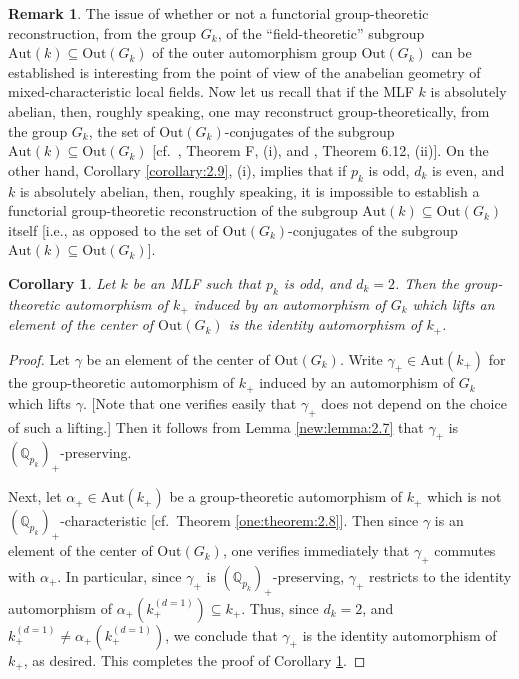 \documentclass[12pt,showkeys]{amsart}
\theoremstyle{theorem}
\newtheorem{corollary}[theorem]{Corollary}
\theoremstyle{definition}
\newtheorem{remark}[theorem]{Remark}
\begin{document}
\begin{remark}\label{remark:2.11}
The issue of whether or not a functorial group-theoretic 
reconstruction, from the group $G_k$, of the 
``field-theoretic'' subgroup $\mathrm{Aut}(k) \subseteq 
\mathrm{Out}(G_k)$ of the outer automorphism group 
$\mathrm{Out}(G_k)$ can be established is interesting 
from the point of view of the anabelian geometry of 
mixed-characteristic local fields.  Now let us recall 
that if the MLF $k$ is absolutely abelian, then, roughly 
speaking, one may reconstruct group-theoretically, from 
the group $G_k$, the set of $\mathrm{Out}(G_k)$-conjugates 
of the subgroup $\mathrm{Aut}(k) \subseteq 
\mathrm{Out}(G_k)$ [cf.\ \cite{Hoshi2}, Theorem F, (i), and 
\cite{Hoshi2}, Theorem 6.12, (ii)].  
On the other hand, Corollary \ref{corollary:2.9}, (i), implies that if 
$p_k$ is odd, $d_k$ is even, and $k$ is absolutely abelian, 
then, roughly speaking, it is impossible to establish a functorial group-theoretic reconstruction of the subgroup 
$\mathrm{Aut}(k) \subseteq \mathrm{Out}(G_k)$ itself [i.e., 
as opposed to the set of $\mathrm{Out}(G_k)$-conjugates of the 
subgroup $\mathrm{Aut}(k) \subseteq \mathrm{Out}(G_k)$]. 
\end{remark}

\begin{corollary}\label{Corollary 3.8} 
Let $k$ be an MLF such that $p_k$ is odd, and $d_k = 2$. 
Then the group-theoretic automorphism of $k_+$ induced by an 
automorphism of $G_k$ which lifts an element of the center of 
$\mathrm{Out}(G_k)$ is the identity automorphism of $k_+$.  
\end{corollary}
\begin{proof}
Let $\gamma$ be an element of the center of $\mathrm{Out}(G_k)$.  
Write $\gamma_+ \in \mathrm{Aut}(k_+)$ for the group-theoretic 
automorphism of $k_+$ induced by an automorphism of $G_k$ which 
lifts $\gamma$.  [Note that one verifies easily that $\gamma_+$ 
does not depend on the choice of such a lifting.]  Then it follows from Lemma \ref{new:lemma:2.7} that $\gamma_+$ is $(\mathbb{Q}_{p_k})_+$-preserving. 

Next, let $\alpha_+ \in \mathrm{Aut}(k_+)$ be a group-theoretic 
automorphism of $k_+$ which is not $(\mathbb{Q}_{p_k})_+$-characteristic 
[cf.\ Theorem \ref{one:theorem:2.8}]. Then since $\gamma$ is an element 
of the center of $\mathrm{Out}(G_k)$, one verifies immediately that 
$\gamma_+$ commutes with $\alpha_+$.  In particular, since $\gamma_+$ 
is $(\mathbb{Q}_{p_k})_+$-preserving, $\gamma_+$ restricts to the identity automorphism of $\alpha_+(k_+^{(d=1)}) \subseteq k_+$. 
Thus, since $d_k = 2$, and $k_+^{(d=1)} \neq \alpha_+(k_+^{(d=1)})$, 
we conclude that $\gamma_+$ is the identity automorphism of $k_+$, 
as desired.  This completes the proof of Corollary \ref{Corollary 3.8}. 
\end{proof}
\end{document}
